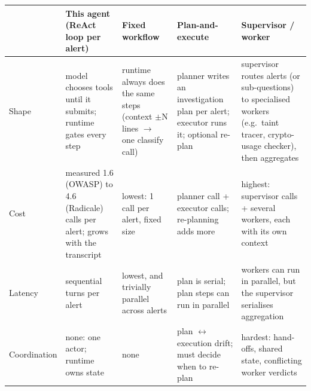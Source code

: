 \documentclass[
  10pt,
]{article}
\newcounter{none} %
\begin{document}
{\def\LTcaptype{none} %
\begin{longtable}[]{@{}
  >{\raggedright\arraybackslash}p{}
  >{\raggedright\arraybackslash}p{}
  >{\raggedright\arraybackslash}p{}
  >{\raggedright\arraybackslash}p{}
  >{\raggedright\arraybackslash}p{}@{}}
\toprule\noalign{}
\begin{minipage}[b]{\linewidth}\raggedright
\end{minipage} & \begin{minipage}[b]{\linewidth}\raggedright
This agent (ReAct loop per alert)
\end{minipage} & \begin{minipage}[b]{\linewidth}\raggedright
Fixed workflow
\end{minipage} & \begin{minipage}[b]{\linewidth}\raggedright
Plan-and-execute
\end{minipage} & \begin{minipage}[b]{\linewidth}\raggedright
Supervisor / worker
\end{minipage} \\
\midrule\noalign{}
\endhead
\bottomrule\noalign{}
\endlastfoot
Shape & model chooses tools until it submits; runtime gates every step &
runtime always does the same steps (context \ensuremath{\pm}N lines \ensuremath{\rightarrow} one classify
call) & planner writes an investigation plan per alert; executor runs
it; optional re-plan & supervisor routes alerts (or sub-questions) to
specialised workers (e.g.~taint tracer, crypto-usage checker), then
aggregates \\
Cost & measured 1.6 (OWASP) to 4.6 (Radicale) calls per alert; grows
with the transcript & lowest: 1 call per alert, fixed size & planner
call + executor calls; re-planning adds more & highest: supervisor calls
+ several workers, each with its own context \\
Latency & sequential turns per alert & lowest, and trivially parallel
across alerts & plan is serial; plan steps can run in parallel & workers
can run in parallel, but the supervisor serialises aggregation \\
Coordination & none: one actor; runtime owns state & none & plan \ensuremath{\leftrightarrow}
execution drift; must decide when to re-plan & hardest: hand-offs,
shared state, conflicting worker verdicts \\

\end{longtable}}
\end{document}
